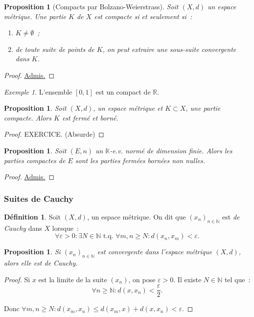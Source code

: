 \documentclass{report}
\newtheorem{prp}[thm]{Proposition}
\theoremstyle{definition}
\newtheorem{déf}[thm]{Définition}
\theoremstyle{remark}
\newtheorem{ex}{Exemple}[chapter]
\newcommand{\K}{\mathbb K}
\newcommand{\R}{\mathbb R}
\newcommand{\N}{\mathbb N}
\newcommand{\tq}{\text{ t.q. }}
\newcommand{\seq}[3]{\left(#1_{#2}\right)_{#2 \in #3}}
\newcommand{\grantedproof}{\begin{proof} \underline{Admis.} \end{proof}}
\begin{document}
				\begin{prp}[Compacts par Bolzano-Weierstrass] Soit $(X, d)$ un espace métrique. Une partie $K$ de $X$ est compacte si et seulement si~:

				\begin{enumerate}
					\item $K \neq \emptyset$~;
					\item de toute suite de points de $K$, on peut extraire une sous-suite convergente dans $K$.
				\end{enumerate}
				\end{prp}

				\grantedproof

				\begin{ex} L'ensemble $[0, 1]$ est un compact de $\R$. \end{ex}

				\begin{prp} Soit $(X, d)$, un espace métrique et $K \subset X$, une partie compacte. Alors $K$ est fermé et borné. \end{prp}

				\begin{proof} EXERCICE. (Absurde)
				\end{proof}

				\begin{prp} Soit $(E, n)$ un $\K$-e.v. normé de dimension finie. Alors les parties compactes de $E$ sont les parties fermées
				bornées non nulles. \end{prp}

				\grantedproof

			\subsubsection{Suites de Cauchy}
				\begin{déf} Soit $(X, d)$, un espace métrique. On dit que $\seq xn\N$ est \textit{de Cauchy} dans $X$ lorsque~:
				\[\forall \varepsilon > 0 : \exists N \in \N \tq \forall m, n \geq N : d(x_n, x_m) < \varepsilon.\]
				\end{déf}

				\begin{prp} Si $\seq xn\N$ est convergente dans l'espace métrique $(X, d)$, alors elle est de Cauchy. \end{prp}

				\begin{proof} Si $x$ est la limite de la suite $(x_n)$, on pose $\varepsilon > 0$. Il existe $N \in \N$ tel que~:
				\[\forall n \geq \N : d(x, x_n) < \frac \varepsilon2.\]

				Donc $\forall m, n \geq N : d(x_m, x_n) \leq d(x_m, x) + d(x, x_n) < \varepsilon$.
				\end{proof}
\end{document}
